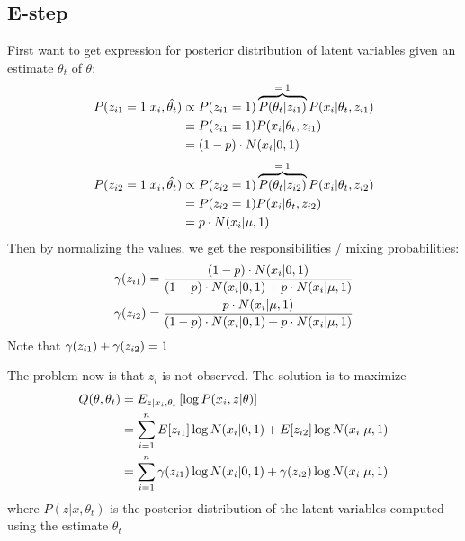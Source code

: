 \documentclass[12pt]{article}
\begin{document}
    \subsection*{E-step}
        First want to get expression for posterior distribution of latent variables given an estimate $\theta_t$ of $\theta$:
        \begin{align}
            P(\zo = 1|x_i, \hat{\theta_t}) &\propto P(\zo = 1) \overtext{P(\theta_t|\zo)}{$=1$} P(x_i|\theta_t,\zo) \\
            &= P(\zo = 1) P(x_i|\theta_t,\zo) \\
            &= (1-p) \cdot N(x_i|0,1)
        \end{align}
        \begin{align}
            P(\zt = 1|x_i, \hat{\theta_t}) &\propto P(\zt = 1) \overtext{P(\theta_t|\zt)}{$=1$} P(x_i|\theta_t,\zt) \\
            &= P(\zt = 1) P(x_i|\theta_t,\zt) \\
            &= p \cdot N(x_i|\mu,1)
        \end{align}
        Then by normalizing the values, we get the responsibilities / mixing probabilities:
        \begin{align}
            \gamma({z_{i1}}) &= \frac{(1-p) \cdot N(x_i|0,1)}{(1-p) \cdot N(x_i|0,1) + p \cdot N(x_i|\mu,1)} \\
            \gamma({z_{i2}}) &= \frac{p \cdot N(x_i|\mu,1)}{(1-p) \cdot N(x_i|0,1) + p \cdot N(x_i|\mu,1)} 
        \end{align}
        Note that $\gamma({z_{i1}}) + \gamma({z_{i2}})=1$

        \vspace{5mm}
        \noindent The problem now is that $z_i$ is not observed. The solution is to maximize
        \begin{align}
            Q(\theta, \theta_t) &= E_{z|x_i,\theta_t} \left[\log P(x_i,z|\theta)\right] \\
            &= \sum\limits_{i=1}^{n} E[{z_{i1}}] \log N(x_i|0,1) + E[{z_{i2}}] \log N(x_i|\mu,1) \\
            &= \sum\limits_{i=1}^{n} \gamma({z_{i1}}) \log N(x_i|0,1) + \gamma({z_{i2}}) \log N(x_i|\mu,1) 
        \end{align}
        where $P(z|x,\theta_t)$ is the posterior distribution of the latent variables computed using the estimate $\theta_t$
\end{document}
